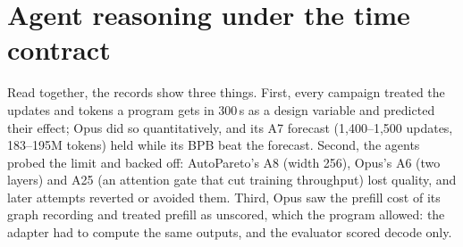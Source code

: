 \documentclass{article}
\newif\ifshowhumanmarkers \showhumanmarkersfalse
\newcommand{\humantag}[1]{{\color{humanframe}\sffamily\scriptsize\bfseries HUMAN AUTHOR MUST REWRITE/VERIFY [#1]}\ }
\newcommand{\humancaption}[1]{\ifshowhumanmarkers\humantag{#1}\fi}
\begin{document}
\begin{table}[H]
\caption{\humancaption{P2-15b}The fixed-time versus fixed-token pilot, read from every Codex launch (\texttt{gpt-5.6-sol}, seed 3, both arms from the same starting model: 8 layers, batch $2^{19}$ tokens, 50.3M parameters). Valid: completed and trained. Six fixed-time attempts of the 6 September warm-up launch checkpointed an untrained model because of a harness defect (\S\ref{sec:pilot}) and are excluded. Batch sizes, depths and parameters are read from each valid attempt's frozen source and record. Best: parameters of the attempt with the lowest validation BPB in that arm. Each launch ran each arm once, and the harness changed between launches.}\label{tab:pilot}
\centering\scriptsize\setlength{\tabcolsep}{4pt}
\end{table}

\section{Agent reasoning under the time contract}\label{app:reasoning}
\begin{table}[H]
\caption{What the agents wrote before each attempt, next to what the attempt measured. Excerpts are verbatim from the attempt records (hypothesis, intended change or patch) and are checked against them by \texttt{analysis/cr\_v2.py}. Outcomes come from the same records (parent$\to$attempt, 300\,s, validation BPB, comparable within a campaign only).}\label{tab:reasoning}
\centering\scriptsize\setlength{\tabcolsep}{3pt}\renewcommand{\arraystretch}{1.12}
\end{table}
Read together, the records show three things. First, every campaign treated the updates and tokens a program gets in 300\,s as a design variable and predicted their effect; Opus did so quantitatively, and its A7 forecast (1,400--1,500 updates, 183--195M tokens) held while its BPB beat the forecast. Second, the agents probed the limit and backed off: AutoPareto's A8 (width 256), Opus's A6 (two layers) and A25 (an attention gate that cut training throughput) lost quality, and later attempts reverted or avoided them. Third, Opus saw the prefill cost of its graph recording and treated prefill as unscored, which the program allowed: the adapter had to compute the same outputs, and the evaluator scored decode only.
\end{document}
